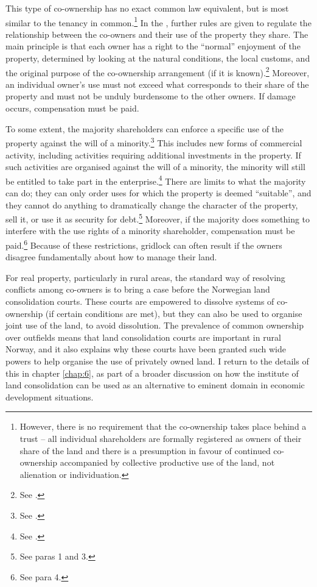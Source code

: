 This type of co-ownership has no exact common law equivalent, but is most similar to the tenancy in common.\footnote{However, there is no requirement that the co-ownership takes place behind a trust -- all individual shareholders are formally registered as owners of their share of the land and there is a presumption in favour of continued co-ownership accompanied by collective productive use of the land, not alienation or individuation.} In the \cite{coa65}, further rules are given to regulate the relationship between the co-owners and their use of the property they share. The main principle is that each owner has a right to the ``normal'' enjoyment of the property, determined by looking at the natural conditions, the local customs, and the original purpose of the co-ownership arrangement (if it is known).\footnote{See \cite[4]{coa65}.} Moreover, an individual owner's use must not exceed what corresponds to their share of the property and must not be unduly burdensome to the other owners. If damage occurs, compensation must be paid.

To some extent, the majority shareholders can enforce a specific use of the property against the will of a minority.\footnote{See \cite[4]{coa65}.} This includes new forms of commercial activity, including activities requiring additional investments in the property. If such activities are organised against the will of a minority, the minority will still be entitled to take part in the enterprise.\footnote{See \cite[5]{coa65}.} There are limits to what the majority can do; they can only order uses for which the property is deemed ``suitable'', and they cannot do anything to dramatically change the character of the property, sell it, or use it as security for debt.\footnote{See \cite[4]{coa65} paras 1 and 3.} Moreover, if the majority does something to interfere with the use rights of a minority shareholder, compensation must be paid.\footnote{See \cite[4]{coa65} para 4.} Because of these restrictions, gridlock can often result if the owners disagree fundamentally about how to manage their land.

For real property, particularly in rural areas, the standard way of resolving conflicts among co-owners is to bring a case before the Norwegian land consolidation courts. These courts are empowered to dissolve systems of co-ownership (if certain conditions are met), but they can also be used to organise joint use of the land, to avoid dissolution. The prevalence of common ownership over outfields means that land consolidation courts are important in rural Norway, and it also explains why these courts have been granted such wide powers to help organise the use of privately owned land. I return to the details of this in chapter \ref{chap:6}, as part of a broader discussion on how the institute of land consolidation can be used as an alternative to eminent domain in economic development situations.

